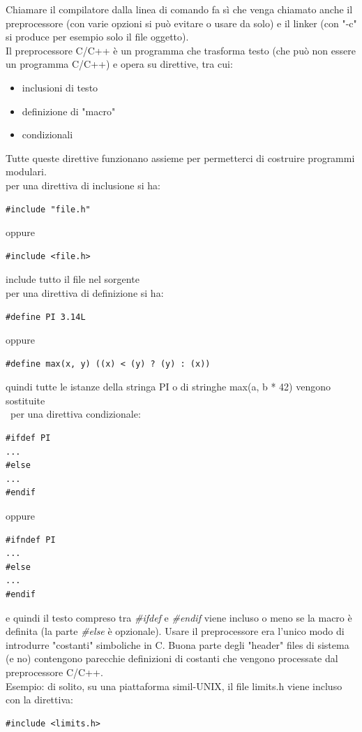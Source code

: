 \documentclass[a4paper,12pt, oneside]{book}
\begin{document}
	Chiamare il compilatore dalla linea di comando fa sì
	che venga chiamato anche il preprocessore (con varie opzioni si può evitare o usare da solo) e il linker (con "-c" si produce per esempio solo il file oggetto).\\
	Il preprocessore C/C++ è un programma che trasforma testo (che può non essere un programma C/C++) e opera su direttive, tra cui:
	\begin{itemize}
		\item inclusioni di testo
		\item definizione di "macro"
		\item condizionali
	\end{itemize}
	Tutte queste direttive funzionano assieme per permetterci di
	costruire programmi modulari.\\
	per una direttiva di inclusione si ha:
	\begin{verbatim}
#include "file.h"
\end{verbatim}
	oppure
	\begin{verbatim}
#include <file.h>
\end{verbatim}
	include tutto il file nel sorgente\\
	per una direttiva di definizione si ha:
	\begin{verbatim}
#define PI 3.14L
\end{verbatim}
	oppure
	\begin{verbatim}
#define max(x, y) ((x) < (y) ? (y) : (x))
\end{verbatim}
	quindi tutte le istanze della stringa PI o di stringhe max(a, b * 42) vengono sostituite\\\
	per una direttiva condizionale:
	\begin{verbatim}
#ifdef PI
...
#else
...
#endif
\end{verbatim}
	oppure
	\begin{verbatim}
#ifndef PI
...
#else
...
#endif
\end{verbatim}
	e quindi il testo compreso tra \textit{\#ifdef} e\textit{ \#endif }viene incluso o meno se la
	macro è definita (la parte\textit{ \#else} è opzionale).
	\newpage
	Usare il preprocessore era l'unico modo di introdurre "costanti" simboliche in C. Buona parte degli "header" files di sistema (e no) contengono parecchie
	definizioni di costanti che vengono processate dal preprocessore C/C++.
	\\
	Esempio: di solito, su una piattaforma simil-UNIX, il file limits.h
	viene incluso con la direttiva:
	\begin{verbatim}
#include <limits.h>
\end{verbatim}
\end{document}
